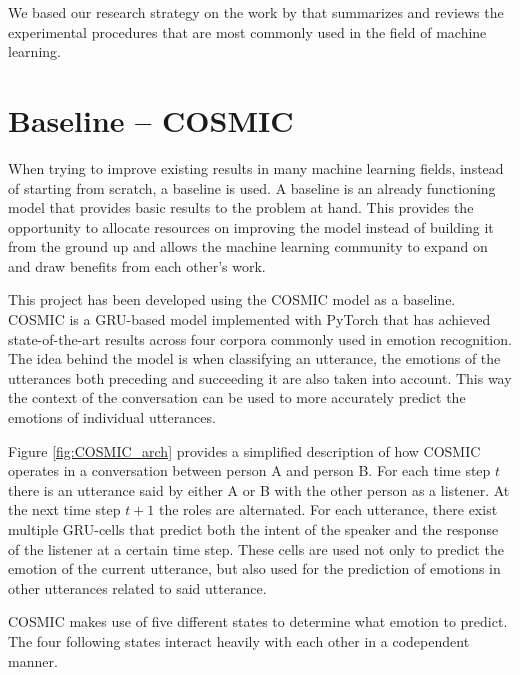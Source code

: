 \documentclass[nofilelist]{cslthse-msc}
\begin{document}
We based our research strategy on the work by \citet{bouthillier:hal-02447823} that summarizes and reviews the experimental procedures that are most commonly used in the field of machine learning.

\section{Baseline -- COSMIC}
When trying to improve existing results in many machine learning fields, instead of starting from scratch, a baseline is used. A baseline is an already functioning model that provides basic results to the problem at hand. This provides the opportunity to allocate resources on improving the model instead of building it from the ground up and allows the machine learning community to expand on and draw benefits from each other's work. 

This project has been developed using the COSMIC model \citep{ghosal2020cosmic} as a baseline. COSMIC is a GRU-based model implemented with PyTorch that has achieved state-of-the-art results across four corpora commonly used in emotion recognition. The idea behind the model is when classifying an utterance, the emotions of the utterances both preceding and succeeding it are also taken into account. This way the context of the conversation can be used to more accurately predict the emotions of individual utterances. 




Figure \ref{fig:COSMIC_arch} provides a simplified description of how COSMIC operates in a conversation between person A and person B. For each time step $t$ there is an utterance said by either A or B with the other person as a listener. At the next time step $t+1$ the roles are alternated. For each utterance, there exist multiple GRU-cells that predict both the intent of the speaker and the response of the listener at a certain time step. These cells are used not only to predict the emotion of the current utterance, but also used for the prediction of emotions in other utterances related to said utterance. 

COSMIC makes use of five different states to determine what emotion to predict. 
The four following states interact heavily with each other in a codependent manner. 
\end{document}
